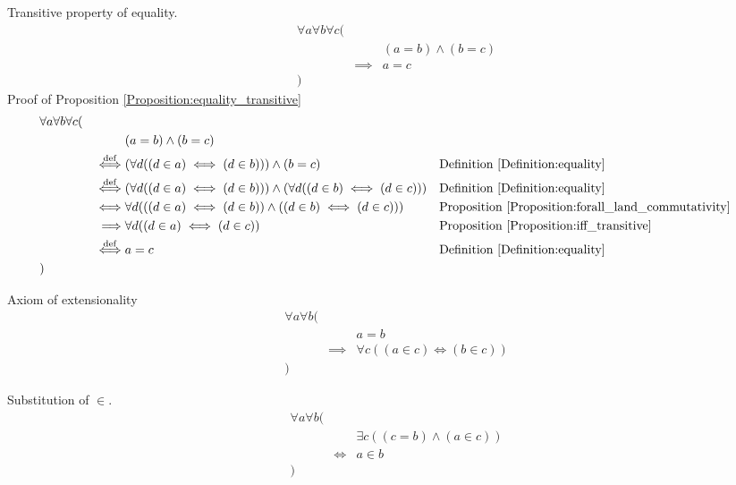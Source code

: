 \begin{prop}
\label{Proposition:equality_transitive}
Transitive property of equality.
\begin{align*}
& \forall a \forall b \forall c ( \\
& & & (a = b) \land (b = c) \\
& & \implies & a = c \\
& )
\end{align*}
Proof of Proposition \ref{Proposition:equality_transitive}
\begin{align*}
& \forall a \forall b \forall c ( \\
& & & (a = b) \land (b = c) \\
& & \overset{\operatorname{def}}{\iff} & (\forall d ((d \in a) \iff (d \in b))) \land (b = c)
& & \text{Definition \ref{Definition:equality}} \\
& & \overset{\operatorname{def}}{\iff} & (\forall d ((d \in a) \iff (d \in b))) \land (\forall d ((d \in b) \iff (d \in c)))
& & \text{Definition \ref{Definition:equality}} \\
& & \iff & \forall d (((d \in a) \iff (d \in b)) \land ((d \in b) \iff (d \in c)))
& & \text{Proposition \ref{Proposition:forall_land_commutativity}} \\
& & \implies & \forall d ((d \in a) \iff (d \in c))
& & \text{Proposition \ref{Proposition:iff_transitive}} \\
& & \overset{\operatorname{def}}{\iff} & a = c
& & \text{Definition \ref{Definition:equality}} \\
& )
\end{align*}
\end{prop}

\begin{axm}
\label{Axiom:extensionality}
Axiom of extensionality
\begin{align*}
& \forall a \forall b ( \\
& & & a = b \\
& & \implies & \forall c ((a \in c) \iff (b \in c)) \\
& )
\end{align*}
\end{axm}

\begin{axm}
\label{Axiom:substitution_in}
Substitution of $\in$.
\begin{align*}
& \forall a \forall b ( \\
& & & \exists c ((c = b) \land (a \in c)) \\
& & \iff & a \in b \\
& )
\end{align*}
\end{axm}

